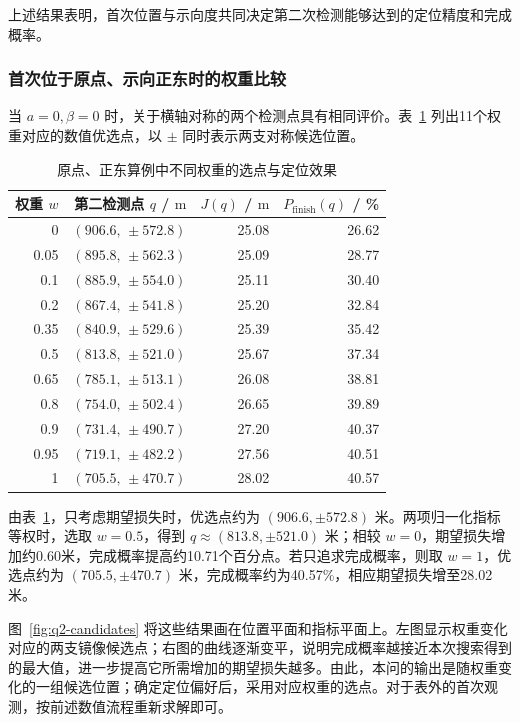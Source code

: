 \documentclass[UTF8,a4paper,zihao=-4,fontset=none]{ctexart}
\begin{document}
上述结果表明，首次位置与示向度共同决定第二次检测能够达到的定位精度和完成概率。

\subsubsection{首次位于原点、示向正东时的权重比较}

当 \(a=0,\beta=0\) 时，关于横轴对称的两个检测点具有相同评价。表~\ref{tab:q2-origin-weights} 列出11个权重对应的数值优选点，以 \(\pm\) 同时表示两支对称候选位置。

\begin{table}[htbp]
  \centering
  \caption{原点、正东算例中不同权重的选点与定位效果}
  \label{tab:q2-origin-weights}
  \small
  \renewcommand{\arraystretch}{1.08}
  \begin{tabular}{rrrr}
    \toprule
    权重 \(w\) & 第二检测点 \(q\) / \(\mathrm{m}\) & \(J(q)\) / \(\mathrm{m}\) & \(P_{\mathrm{finish}}(q)\) / \% \\
    \midrule
    0 & \((906.6,\,\pm572.8)\) & 25.08 & 26.62 \\
    0.05 & \((895.8,\,\pm562.3)\) & 25.09 & 28.77 \\
    0.1 & \((885.9,\,\pm554.0)\) & 25.11 & 30.40 \\
    0.2 & \((867.4,\,\pm541.8)\) & 25.20 & 32.84 \\
    0.35 & \((840.9,\,\pm529.6)\) & 25.39 & 35.42 \\
    0.5 & \((813.8,\,\pm521.0)\) & 25.67 & 37.34 \\
    0.65 & \((785.1,\,\pm513.1)\) & 26.08 & 38.81 \\
    0.8 & \((754.0,\,\pm502.4)\) & 26.65 & 39.89 \\
    0.9 & \((731.4,\,\pm490.7)\) & 27.20 & 40.37 \\
    0.95 & \((719.1,\,\pm482.2)\) & 27.56 & 40.51 \\
    1 & \((705.5,\,\pm470.7)\) & 28.02 & 40.57 \\
    \bottomrule
  \end{tabular}
\end{table}

由表~\ref{tab:q2-origin-weights}，只考虑期望损失时，优选点约为 \((906.6,\pm572.8)\) 米。两项归一化指标等权时，选取 \(w=0.5\)，得到 \(q\approx(813.8,\pm521.0)\) 米；相较 \(w=0\)，期望损失增加约0.60米，完成概率提高约10.71个百分点。若只追求完成概率，则取 \(w=1\)，优选点约为 \((705.5,\pm470.7)\) 米，完成概率约为40.57\%，相应期望损失增至28.02米。

图~\ref{fig:q2-candidates} 将这些结果画在位置平面和指标平面上。左图显示权重变化对应的两支镜像候选点；右图的曲线逐渐变平，说明完成概率越接近本次搜索得到的最大值，进一步提高它所需增加的期望损失越多。由此，本问的输出是随权重变化的一组候选位置；确定定位偏好后，采用对应权重的选点。对于表外的首次观测，按前述数值流程重新求解即可。
\end{document}
